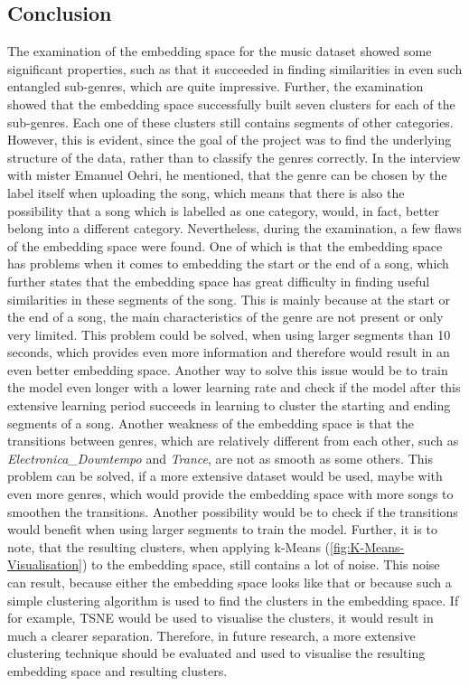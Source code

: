 \subsection{Conclusion}
\label{sub:Results-Music-Conclusion}
The examination of the embedding space for the music dataset showed some significant properties, such as that it succeeded in finding similarities in even such entangled sub-genres, which are quite impressive. Further, the examination showed that the embedding space successfully built seven clusters for each of the sub-genres. Each one of these clusters still contains segments of other categories. However, this is evident, since the goal of the project was to find the underlying structure of the data, rather than to classify the genres correctly. In the interview with mister Emanuel Oehri, he mentioned, that the genre can be chosen by the label itself when uploading the song, which means that there is also the possibility that a song which is labelled as one category, would, in fact, better belong into a different category.
\newline
\newline
Nevertheless, during the examination, a few flaws of the embedding space were found. One of which is that the embedding space has problems when it comes to embedding the start or the end of a song, which further states that the embedding space has great difficulty in finding useful similarities in these segments of the song. This is mainly because at the start or the end of a song, the main characteristics of the genre are not present or only very limited. This problem could be solved, when using larger segments than 10 seconds, which provides even more information and therefore would result in an even better embedding space. Another way to solve this issue would be to train the model even longer with a lower learning rate and check if the model after this extensive learning period succeeds in learning to cluster the starting and ending segments of a song.
\newline
\newline
Another weakness of the embedding space is that the transitions between genres, which are relatively different from each other, such as \textit{Electronica\_Downtempo} and \textit{Trance}, are not as smooth as some others. This problem can be solved, if a more extensive dataset would be used, maybe with even more genres, which would provide the embedding space with more songs to smoothen the transitions. Another possibility would be to check if the transitions would benefit when using larger segments to train the model.
\newline
\newline
Further, it is to note, that the resulting clusters, when applying k-Means (\ref{fig:K-Means-Visualisation}) to the embedding space, still contains a lot of noise. This noise can result, because either the embedding space looks like that or because such a simple clustering algorithm is used to find the clusters in the embedding space. If for example, \gls{TSNE} would be used to visualise the clusters, it would result in much a clearer separation. Therefore, in future research, a more extensive clustering technique should be evaluated and used to visualise the resulting embedding space and resulting clusters. 
